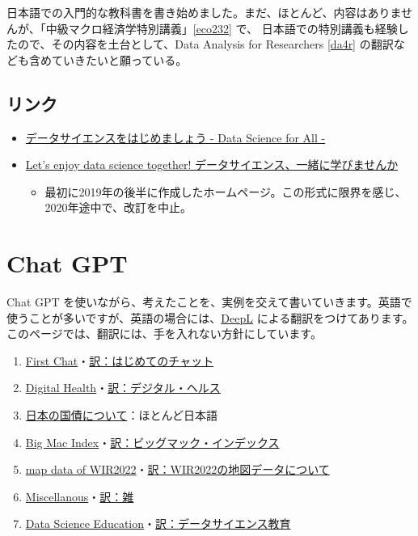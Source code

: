 \documentclass[
]{book}
\providecommand{\tightlist}{%
  \setlength{\itemsep}{0pt}\setlength{\parskip}{0pt}}
\theoremstyle{definition}
\theoremstyle{definition}
\theoremstyle{definition}
\theoremstyle{definition}
\theoremstyle{remark}
\begin{document}
日本語での入門的な教科書を書き始めました。まだ、ほとんど、内容はありませんが、「中級マクロ経済学特別講義」\ref{eco232} で、 日本語での特別講義も経験したので、その内容を土台として、Data Analysis for Researchers \ref{da4r} の翻訳なども含めていきたいと願っている。

\hypertarget{ux30eaux30f3ux30af}{%
\section{リンク}\label{ux30eaux30f3ux30af}}

\begin{itemize}
\item
  \href{https://icu-hsuzuki.github.io/ds4aj/index.html}{データサイエンスをはじめましょう - Data Science for All -}
\item
  \href{https://foods4all.github.io/}{Let's enjoy data science together! データサイエンス、一緒に学びませんか}

  \begin{itemize}
  \tightlist
  \item
    最初に2019年の後半に作成したホームページ。この形式に限界を感じ、2020年途中で、改訂を中止。
  \end{itemize}
\end{itemize}

\hypertarget{chatgpt}{%
\chapter{Chat GPT}\label{chatgpt}}

Chat GPT を使いながら、考えたことを、実例を交えて書いていきます。英語で使うことが多いですが、英語の場合には、\href{https://www.deepl.com/translator}{DeepL} による翻訳をつけてあります。このページでは、翻訳には、手を入れない方針にしています。

\begin{enumerate}
\def\labelenumi{\arabic{enumi}.}
\tightlist
\item
  \protect\hyperlink{firstchat}{First Chat}・\protect\hyperlink{firstchatj}{訳：はじめてのチャット}
\item
  \protect\hyperlink{digitalhealth}{Digital Health}・\protect\hyperlink{digitalhealthj}{訳：デジタル・ヘルス}
\item
  \protect\hyperlink{nationalbond}{日本の国債について}：ほとんど日本語
\item
  \protect\hyperlink{bigmacindex}{Big Mac Index}・\protect\hyperlink{bigmacindexj}{訳：ビッグマック・インデックス}
\item
  \protect\hyperlink{mapdataofwir2022}{map data of WIR2022}・\protect\hyperlink{mapdataofwir2022j}{訳：WIR2022の地図データについて}
\item
  \protect\hyperlink{miscellanous}{Miscellanous}・\protect\hyperlink{miscellanousj}{訳：雑}
\item
  \protect\hyperlink{dseducation}{Data Science Education}・\protect\hyperlink{dseducationj}{訳：データサイエンス教育}
\end{enumerate}
\end{document}
